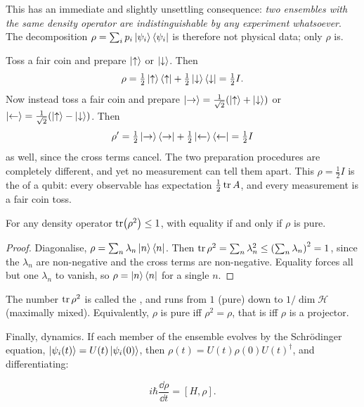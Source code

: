 \documentclass[a4paper]{scrartcl}
\newcommand{\half}{\tfrac{1}{2}}
\begin{document}
This has an immediate and slightly unsettling consequence: \emph{two ensembles with the same density operator are indistinguishable by any experiment whatsoever}. The decomposition $\rho = \sum_i p_i\ket{\psi_i}\bra{\psi_i}$ is therefore not physical data; only $\rho$ is.

\begin{example}
    Toss a fair coin and prepare $\ket\uparrow$ or $\ket\downarrow$. Then
    $$
    \rho = \half\ket\uparrow\bra\uparrow + \half\ket\downarrow\bra\downarrow = \half I.
    $$
    Now instead toss a fair coin and prepare $\ket{\rightarrow} = \frac{1}{\sqrt2}(\ket\uparrow+\ket\downarrow)$ or $\ket\leftarrow = \frac{1}{\sqrt2}(\ket\uparrow - \ket\downarrow)$. Then
    $$
    \rho' = \half\ket\rightarrow\bra\rightarrow + \half\ket\leftarrow\bra\leftarrow = \half I
    $$
    as well, since the cross terms cancel. The two preparation procedures are completely different, and yet no measurement can tell them apart. This $\rho = \half I$ is the  of a qubit: every observable has expectation $\half\tr A$, and every measurement is a fair coin toss.
\end{example}

\begin{proposition}[Purity]
    For any density operator $\tr(\rho^2)\leq1$, with equality if and only if $\rho$ is pure.
\end{proposition}
\begin{proof}
    Diagonalise, $\rho = \sum_n\lambda_n\ket n\bra n$. Then $\tr\rho^2 = \sum_n\lambda_n^2 \leq \left(\sum_n\lambda_n\right)^2 = 1$, since the $\lambda_n$ are non-negative and the cross terms are non-negative. Equality forces all but one $\lambda_n$ to vanish, so $\rho = \ket n\bra n$ for a single $n$.
\end{proof}

The number $\tr\rho^2$ is called the , and runs from $1$ (pure) down to $1/\dim\mathcal{H}$ (maximally mixed). Equivalently, $\rho$ is pure iff $\rho^2 = \rho$, that is iff $\rho$ is a projector.

Finally, dynamics. If each member of the ensemble evolves by the Schr\"odinger equation, $\ket{\psi_i(t)} = U(t)\ket{\psi_i(0)}$, then $\rho(t) = U(t)\rho(0)U(t)^\dagger$, and differentiating:

\begin{proposition}
    $$
    i\hbar\frac{\dd \rho}{\dd t} = \left[ H, \rho \right].
    $$
\end{proposition}
\end{document}
